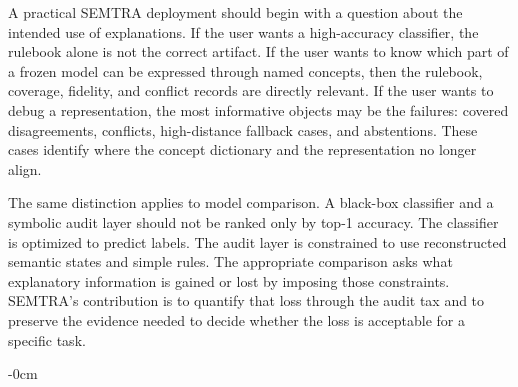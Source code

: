 \documentclass[make,supfile,submit,pdftex,moreauthors]{Definitions/mdpi}
\begin{document}
A practical SEMTRA deployment should begin with a question about the intended use of explanations. If the user wants a high-accuracy classifier, the rulebook alone is not the correct artifact. If the user wants to know which part of a frozen model can be expressed through named concepts, then the rulebook, coverage, fidelity, and conflict records are directly relevant. If the user wants to debug a representation, the most informative objects may be the failures: covered disagreements, conflicts, high-distance fallback cases, and abstentions. These cases identify where the concept dictionary and the representation no longer align.

The same distinction applies to model comparison. A black-box classifier and a symbolic audit layer should not be ranked only by top-1 accuracy. The classifier is optimized to predict labels. The audit layer is constrained to use reconstructed semantic states and simple rules. The appropriate comparison asks what explanatory information is gained or lost by imposing those constraints. SEMTRA's contribution is to quantify that loss through the audit tax and to preserve the evidence needed to decide whether the loss is acceptable for a specific task.

\begin{adjustwidth}{-\extralength}{0cm}

\end{adjustwidth}
\end{document}
